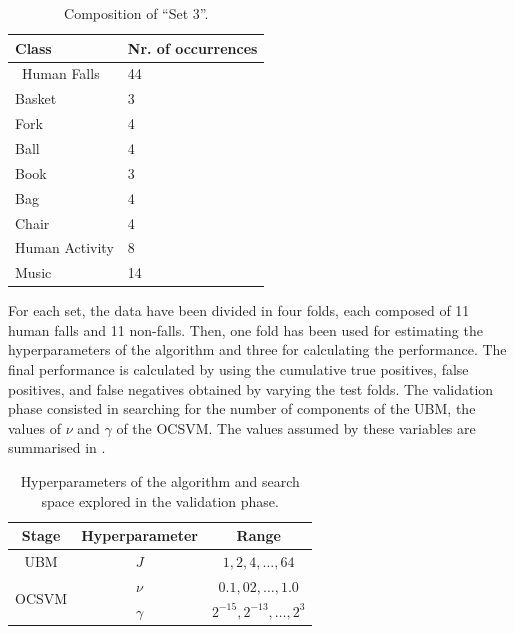 \begin{table}[t]
	
	\caption{Composition  of ``Set 3''.}
	\label{tab:set3Composition}
	\begin{center}
		
		\begin{tabular}{K{3cm}K{3cm}}
			
			\hline
			\textbf{Class} & \textbf{Nr. of occurrences} \\ 

			\hline
			$\,$ Human Falls $\,$ 	& 44    		\\				
			Basket      			& 3            	\\
			Fork        			& 4            	\\
			Ball       			& 4            	\\
			Book        			& 3            	\\
			Bag         			& 4            	\\
			Chair       			& 4    			\\
			Human Activity  		& 8   			\\
			Music			  		& 14   			\\
			
			\hline
		\end{tabular}
		
	\end{center}
		
\end{table}

For each set, the data have been divided in four folds, each composed of 11 human falls and 11 non-falls. Then, one fold has been used for estimating the hyperparameters of the algorithm and three for calculating the performance. The final performance is calculated by using the cumulative true positives, false positives, and false negatives obtained by varying the test folds.
The validation phase consisted in searching for the number of components of the UBM, the values of $\nu$ and $\gamma$ of the OCSVM. The values assumed by these variables are summarised in .

\begin{table}[t]
	\centering
	\caption{Hyperparameters of the algorithm and search space explored in the validation phase.}
	\label{tab:parameter_ocsvm}
	\begin{tabular}{c |c | c}
		\hline
		\textbf{Stage} & \textbf{Hyperparameter} & \textbf{Range} \\
		\hline
		UBM & $J$ & $1, 2, 4, \ldots , 64$\\
		\hline
		\multirow{2}{*}{OCSVM} & $\nu$ & $0.1, 02, \ldots, 1.0$ \\
		&$\gamma$ & $2^{-15}, 2^{-13}, \ldots,2^{3} $ \\
		\hline

	\end{tabular}
\end{table}

